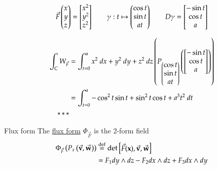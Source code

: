 \[\vec{F}\begin{pmatrix} x \\ y \\ z \end{pmatrix}=\begin{bmatrix} x^2 \\ y^2 \\ z^2 \end{bmatrix}\qquad \gamma : t\mapsto \begin{pmatrix} \cos t \\ \sin t \\ at \end{pmatrix} \qquad D\gamma = \begin{bmatrix} -\sin t \\ \cos t \\ a \end{bmatrix}\]

\begin{align*}
	\int_C W_{\vec{F}} &= \int_{t=0}^{a} x^2\ dx + y^2\ dy + z^2\ dz \left( P_{\begin{pmatrix} \cos t \\ \sin t \\ at \end{pmatrix}} \left( \begin{bmatrix} -\sin t \\ \cos t \\ a \end{bmatrix} \right) \right) \\
	&= \int_{t=0}^a -\cos^2 t \sin t + \sin^2 t \cos t + a^3t^2\ dt \\
	***
\end{align*}

\begin{defn}{Flux form}
	The \ul{flux form} $\Phi_{\vec{F}}$ is the 2-form field
	\begin{align}
		\Phi_{\vec{F}}\left( P_x\left( \vec{\textbf{v}}, \vec{\textbf{w}} \right) \right) &\overset{\text{def}}{=} \mathrm{det} \begin{bmatrix} \vec{F}(\textbf{x}), \vec{\textbf{v}}, \vec{\textbf{w}} \end{bmatrix} \\
		&= F_1 dy\land dz - F_2 dx\land dz + F_3 dx\land dy
	\end{align}
\end{defn}


